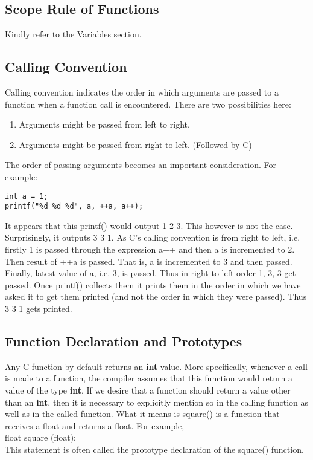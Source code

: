 \subsection{Scope Rule of Functions}
Kindly refer to the Variables section.

\subsection{Calling Convention}
Calling convention indicates the order in which arguments are passed to a function when a function call is encountered. There are two possibilities here:
\begin{enumerate}
    \item Arguments might be passed from left to right.
    \item Arguments might be passed from right to left. (Followed by C)
\end{enumerate}
The order of passing arguments becomes an important consideration. For example:

\begin{lstlisting}[style=CStyle]
int a = 1;
printf("%d %d %d", a, ++a, a++);
\end{lstlisting}
It appears that this printf() would output 1 2 3.
This however is not the case. Surprisingly, it outputs 3 3 1. As C's calling convention is from right to left, i.e. firstly 1 is passed through the expression a++ and then a is incremented to 2. Then result of ++a is passed. That is, a is incremented to 3 and then passed. Finally, latest value of a, i.e. 3, is passed. Thus in right to left order 1, 3, 3 get passed. Once printf() collects them it prints them in the order in which we have asked it to get them printed (and not the order in which they were passed). Thus 3 3 1 gets printed.


\subsection{Function Declaration and Prototypes}
Any C function by default returns an \textbf{int} value. More specifically, whenever a call is made to a function, the compiler assumes that this function would return a value of the type \textbf{int}. If we desire that a function should return a value other than an \textbf{int}, then it is necessary to explicitly mention so in the calling function as well as in the called function. What it means is square() is a function that receives a float and returns a float. For example,\\
float square (float);\\
This statement is often called the prototype declaration of the square() function.

